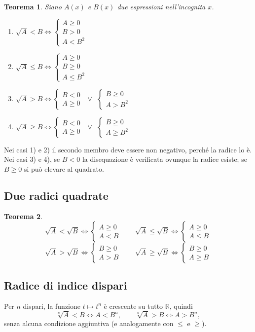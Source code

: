 \documentclass[12pt,a4paper,openany]{book}
\theoremstyle{definition}
\theoremstyle{plain}
\newtheorem{teorema}{Teorema}[section]
\theoremstyle{remark}
\newcommand{\R}{\mathbb{R}}
\newcommand{\sistema}[1]{\begin{cases}#1\end{cases}}
\begin{document}
\begin{teorema}
Siano $A(x)$ e $B(x)$ due espressioni nell'incognita $x$.
\begin{enumerate}[label=\arabic*)]
\item $\displaystyle \sqrt{A}<B\iff \sistema{A\ge 0\\ B>0\\ A<B^2}$
\item $\displaystyle \sqrt{A}\le B\iff \sistema{A\ge 0\\ B\ge 0\\ A\le B^2}$
\item $\displaystyle \sqrt{A}>B\iff \sistema{B<0\\ A\ge 0}\ \ \lor\ \ \sistema{B\ge 0\\ A>B^2}$
\item $\displaystyle \sqrt{A}\ge B\iff \sistema{B<0\\ A\ge 0}\ \ \lor\ \ \sistema{B\ge 0\\ A\ge B^2}$
\end{enumerate}
\end{teorema}

Nei casi 1) e 2) il secondo membro deve essere non negativo, perché la radice lo è. Nei casi 3) e 4), se $B<0$ la disequazione è verificata ovunque la radice esiste; se $B\ge 0$ si può elevare al quadrato.

\subsection*{Due radici quadrate}

\begin{teorema}
\[
\sqrt{A}<\sqrt{B}\iff \sistema{A\ge 0\\ A<B}\qquad
\sqrt{A}\le\sqrt{B}\iff \sistema{A\ge 0\\ A\le B}
\]
\[
\sqrt{A}>\sqrt{B}\iff \sistema{B\ge 0\\ A>B}\qquad
\sqrt{A}\ge\sqrt{B}\iff \sistema{B\ge 0\\ A\ge B}
\]
\end{teorema}

\subsection*{Radice di indice dispari}

Per $n$ dispari, la funzione $t\mapsto t^n$ è crescente su tutto $\R$, quindi
\[
\sqrt[n]{A}<B\iff A<B^n,\qquad \sqrt[n]{A}>B\iff A>B^n,
\]
senza alcuna condizione aggiuntiva (e analogamente con $\le$ e $\ge$).
\end{document}
